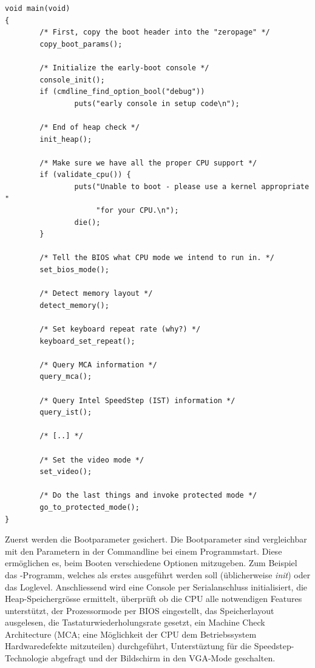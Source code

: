 \begin{lstlisting}[label=x86init,caption=linux/arch/x86/boot/main.c]
void main(void)
{
        /* First, copy the boot header into the "zeropage" */
        copy_boot_params();

        /* Initialize the early-boot console */
        console_init();
        if (cmdline_find_option_bool("debug"))
                puts("early console in setup code\n");

        /* End of heap check */
        init_heap();

        /* Make sure we have all the proper CPU support */
        if (validate_cpu()) {
                puts("Unable to boot - please use a kernel appropriate "
                     "for your CPU.\n");
                die();
        }

        /* Tell the BIOS what CPU mode we intend to run in. */
        set_bios_mode();

        /* Detect memory layout */
        detect_memory();

        /* Set keyboard repeat rate (why?) */
        keyboard_set_repeat();

        /* Query MCA information */
        query_mca();

        /* Query Intel SpeedStep (IST) information */
        query_ist();

        /* [..] */

        /* Set the video mode */
        set_video();

        /* Do the last things and invoke protected mode */
        go_to_protected_mode();
}
\end{lstlisting}

Zuerst werden die Bootparameter gesichert. Die Bootparameter sind vergleichbar mit den Parametern in der Commandline bei einem
Programmstart. Diese ermöglichen es, beim \clearpage Booten verschiedene Optionen mitzugeben. Zum Beispiel das -Programm,
welches als erstes ausgeführt werden soll (üblicherweise \emph{init}) oder das Loglevel. Anschliessend wird eine Console per
Serialanschluss initialisiert, die Heap-Speichergrösse ermittelt, überprüft ob die CPU alle notwendigen Features unterstützt,
der Prozessormode per BIOS eingestellt, das Speicherlayout ausgelesen, die Tastaturwiederholungsrate gesetzt, ein
Machine Check Architecture (MCA; eine Möglichkeit der CPU dem Betriebssystem Hardwaredefekte mitzuteilen) durchgeführt, Unterstüztung 
für die Speedstep-Technologie abgefragt und der Bildschirm in den VGA-Mode geschalten. \\

